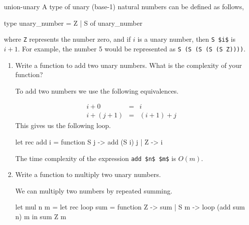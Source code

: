 %
\begin{exercise}{union-unary}
A type of unary (base-1) natural numbers can be defined as follows,

\begin{ocaml}
type unary_number = Z | S of unary_number
\end{ocaml}
%
where \hbox{\lstinline/Z/} represents the number zero, and if $i$ is a unary number, then \hbox{\lstinline/S $i$/}
is $i + 1$.  For example, the number 5 would be represented as \hbox{\lstinline/S (S (S (S (S Z))))/}.

\begin{enumerate}
\item Write a function to add two unary numbers.  What is the complexity of your function?

\begin{answer}\ifanswers
To add two numbers we use the following equivalences.

\begin{eqnarray*}
i + 0 & = & i\\
i + (j + 1) & = & (i + 1) + j
\end{eqnarray*}
%
This gives us the following loop.

\begin{ocaml}
let rec add i = function
   S j -> add (S i) j
 | Z -> i
\end{ocaml}
%
The time complexity of the expression \hbox{\lstinline/add $n$ $m$/} is $O(m)$.
\fi\end{answer}

\item Write a function to multiply two unary numbers.

\begin{answer}\ifanswers
We can multiply two numbers by repeated summing.

\begin{ocaml}
let mul n m =
   let rec loop sum = function
      Z -> sum
    | S m -> loop (add sum n) m
   in
      sum Z m
\end{ocaml}
\fi\end{answer}
\end{enumerate}
\end{exercise}

